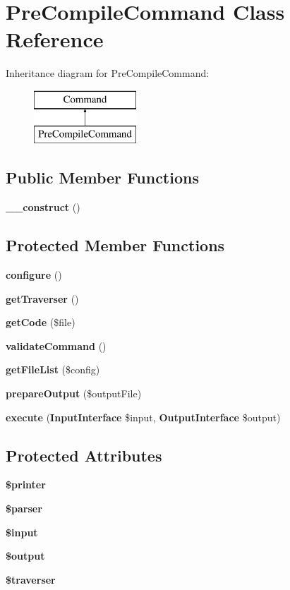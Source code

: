 \section{Pre\+Compile\+Command Class Reference}
\label{class_class_preloader_1_1_command_1_1_pre_compile_command}
Inheritance diagram for Pre\+Compile\+Command\+:\begin{figure}[H]
\begin{center}
\leavevmode
\includegraphics[height=2.000000cm]{class_class_preloader_1_1_command_1_1_pre_compile_command}
\end{center}
\end{figure}
\subsection*{Public Member Functions}
\begin{DoxyCompactItemize}
\item 
{\bf \+\_\+\+\_\+construct} ()
\end{DoxyCompactItemize}
\subsection*{Protected Member Functions}
\begin{DoxyCompactItemize}
\item 
{\bf configure} ()
\item 
{\bf get\+Traverser} ()
\item 
{\bf get\+Code} (\$file)
\item 
{\bf validate\+Command} ()
\item 
{\bf get\+File\+List} (\$config)
\item 
{\bf prepare\+Output} (\$output\+File)
\item 
{\bf execute} ({\bf Input\+Interface} \$input, {\bf Output\+Interface} \$output)
\end{DoxyCompactItemize}
\subsection*{Protected Attributes}
\begin{DoxyCompactItemize}
\item 
{\bf \$printer}
\item 
{\bf \$parser}
\item 
{\bf \$input}
\item 
{\bf \$output}
\item 
{\bf \$traverser}
\end{DoxyCompactItemize}


